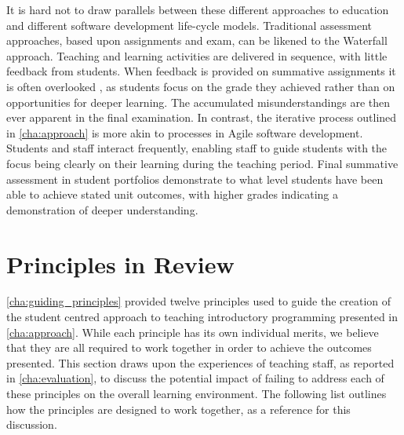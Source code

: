 It is hard not to draw parallels between these different approaches to education and different software development life-cycle models. Traditional assessment approaches, based upon assignments and exam, can be likened to the Waterfall approach. Teaching and learning activities are delivered in sequence, with little feedback from students. When feedback is provided on summative assignments it is often overlooked \cite{Black:1998}, as students focus on the grade they achieved rather than on opportunities for deeper learning. The accumulated misunderstandings are then ever apparent in the final examination. In contrast, the iterative process outlined in \cref{cha:approach} is more akin to processes in Agile software development. Students and staff interact frequently, enabling staff to guide students with the focus being clearly on their learning during the teaching period. Final summative assessment in student portfolios demonstrate to what level students have been able to achieve stated unit outcomes, with higher grades indicating a demonstration of deeper understanding.


\section{Principles in Review} %
\label{sec:principles_in_review}

\cref{cha:guiding_principles} provided twelve principles used to guide the creation of the student centred approach to teaching introductory programming presented in \cref{cha:approach}. While each principle has its own individual merits, we believe that they are all required to work together in order to achieve the outcomes presented. This section draws upon the experiences of teaching staff, as reported in \cref{cha:evaluation}, to discuss the potential impact of failing to address each of these principles on the overall learning environment. The following list outlines how the principles are designed to work together, as a reference for this discussion.

